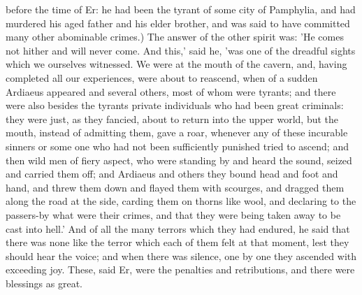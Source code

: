 \documentclass[12pt]{article}
\begin{document}
before the time of Er: he had been the tyrant of some city of Pamphylia, and had murdered his aged father and his elder brother, and was said to have committed many other abominable crimes.) The answer of the other spirit was: 'He comes not hither and will never come. And this,' said he, 'was one of the dreadful sights which we ourselves witnessed. We were at the mouth of the cavern, and, having completed all our experiences, were about to reascend, when of a sudden Ardiaeus appeared and several others, most of whom were tyrants; and there were also besides the tyrants private individuals who had been great criminals: they were just, as they fancied, about to return into the upper world, but the mouth, instead of admitting them, gave a roar, whenever any of these incurable sinners or some one who had not been sufficiently punished tried to ascend; and then wild men of fiery aspect, who were standing by and heard the sound, seized and carried them off; and Ardiaeus and others they bound head and foot and hand, and threw them down and flayed them with scourges, and dragged them along the road at the side, carding them on thorns like wool, and declaring to the passers-by what were their crimes, and that they were being taken away to be cast into hell.' And of all the many terrors which they had endured, he said that there was none like the terror which each of them felt at that moment, lest they should hear the voice; and when there was silence, one by one they ascended with exceeding joy. These, said Er, were the penalties and retributions, and there were blessings as great.
\end{document}
